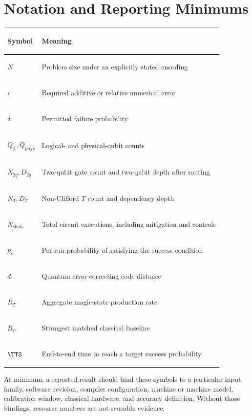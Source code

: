 \section{Notation and Reporting Minimums}

\begin{tabularx}{\textwidth}{>{\bfseries\raggedright\arraybackslash}p{} X}
\toprule
Symbol & Meaning\\
\midrule
$N$ & Problem size under an explicitly stated encoding\\
$\epsilon$ & Required additive or relative numerical error\\
$\delta$ & Permitted failure probability\\
$Q_L,Q_{\mathrm{phys}}$ & Logical- and physical-qubit counts\\
$N_{2q},D_{2q}$ & Two-qubit gate count and two-qubit depth after routing\\
$N_T,D_T$ & Non-Clifford $T$ count and dependency depth\\
$N_{\mathrm{shots}}$ & Total circuit executions, including mitigation and controls\\
$p_s$ & Per-run probability of satisfying the success condition\\
$d$ & Quantum error-correcting code distance\\
$R_T$ & Aggregate magic-state production rate\\
$B_C$ & Strongest matched classical baseline\\
$\TTS$ & End-to-end time to reach a target success probability\\
\bottomrule
\end{tabularx}

At minimum, a reported result should bind these symbols to a particular input family, software revision, compiler configuration, machine or machine model, calibration window, classical hardware, and accuracy definition. Without those bindings, resource numbers are not reusable evidence.
